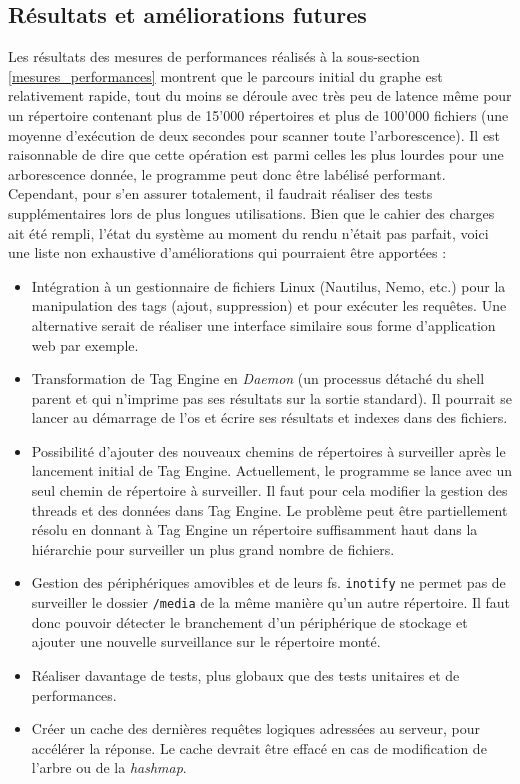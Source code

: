 \subsection{Résultats et améliorations futures}
Les résultats des mesures de performances réalisés à la sous-section \ref{mesures_performances} 
montrent que le parcours initial du graphe est relativement rapide, tout du moins se déroule 
avec très peu de latence même pour un répertoire contenant plus de 15'000 répertoires et plus de 
100'000 fichiers (une moyenne d'exécution de deux secondes pour scanner toute l'arborescence). Il 
est raisonnable de dire que cette opération est parmi celles les plus lourdes pour une arborescence 
donnée, le programme peut donc être labélisé performant. Cependant, pour s'en assurer totalement, 
il faudrait réaliser des tests supplémentaires lors de plus longues utilisations.
\bigbreak
Bien que le cahier des charges ait été rempli, l'état du système au moment du rendu n'était pas parfait, 
voici une liste non exhaustive d'améliorations qui pourraient être apportées :
\begin{itemize}
    \item Intégration à un gestionnaire de fichiers Linux (Nautilus, Nemo, etc.) pour la manipulation
        des tags (ajout, suppression) et pour exécuter les requêtes. Une alternative serait de réaliser 
        une interface similaire sous forme d'application web par exemple.
    \item Transformation de Tag Engine en \textit{Daemon} (un processus détaché du shell parent et 
        qui n'imprime pas ses résultats sur la sortie standard). Il pourrait se lancer au démarrage 
        de l'\acrshort{os} et écrire ses résultats et indexes dans des fichiers.
    \item Possibilité d'ajouter des nouveaux chemins de répertoires à surveiller après le lancement 
        initial de Tag Engine. Actuellement, le programme se lance avec un seul chemin de répertoire
        à surveiller. Il faut pour cela modifier la gestion des threads et des données dans Tag 
        Engine. Le problème peut être partiellement résolu en donnant à Tag Engine un répertoire 
        suffisamment haut dans la hiérarchie pour surveiller un plus grand nombre de fichiers.
    \item Gestion des périphériques amovibles et de leurs \acrshort{fs}. \texttt{inotify} ne 
        permet pas de surveiller le dossier \texttt{/media} de la même manière qu'un 
        autre répertoire. Il faut donc pouvoir détecter le branchement d'un périphérique de stockage 
        et ajouter une nouvelle surveillance sur le répertoire monté.
    \item Réaliser davantage de tests, plus globaux que des tests unitaires et de performances.
    \item Créer un cache des dernières requêtes logiques adressées au serveur, pour accélérer la 
        réponse. Le cache devrait être effacé en cas de modification de l'arbre ou de la \textit{hashmap}.
\end{itemize}

